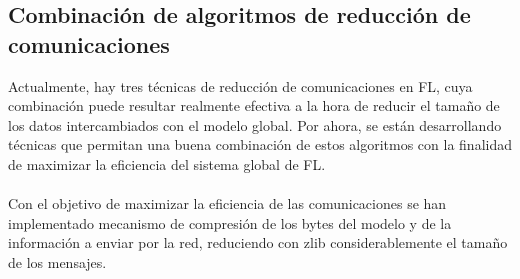 \subsection{Combinación de algoritmos de reducción de comunicaciones}
Actualmente, hay tres técnicas de reducción de comunicaciones en FL, cuya combinación puede resultar realmente efectiva a la hora de reducir el tamaño de los datos intercambiados con el modelo global. Por ahora, se están desarrollando técnicas que permitan una buena combinación de estos algoritmos con la finalidad de maximizar la eficiencia del sistema global de FL.
\\ \\
Con el objetivo de maximizar la eficiencia de las comunicaciones se han implementado mecanismo de compresión de los bytes del modelo y de la información a enviar por la red, reduciendo con zlib considerablemente el tamaño de los mensajes.

